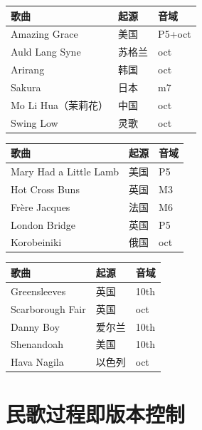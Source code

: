 \documentclass[11pt]{article}
\begin{document}
\begin{card}
\begin{tabularx}{\linewidth}{Xll}
\toprule
\textbf{歌曲} & \textbf{起源} & \textbf{音域} \\
\midrule
Amazing Grace & 美国 & P5+oct \\
Auld Lang Syne & 苏格兰 & oct \\
Arirang & 韩国 & oct \\
Sakura & 日本 & m7 \\
Mo Li Hua（茉莉花） & 中国 & oct \\
Swing Low & 灵歌 & oct \\
\bottomrule
\end{tabularx}
\end{card}

\begin{card}
\begin{tabularx}{\linewidth}{Xll}
\toprule
\textbf{歌曲} & \textbf{起源} & \textbf{音域} \\
\midrule
Mary Had a Little Lamb & 美国 & P5 \\
Hot Cross Buns & 英国 & M3 \\
Fr\`ere Jacques & 法国 & M6 \\
London Bridge & 英国 & P5 \\
Korobeiniki & 俄国 & oct \\
\bottomrule
\end{tabularx}
\end{card}

\begin{card}
\begin{tabularx}{\linewidth}{Xll}
\toprule
\textbf{歌曲} & \textbf{起源} & \textbf{音域} \\
\midrule
Greensleeves & 英国 & 10th \\
Scarborough Fair & 英国 & oct \\
Danny Boy & 爱尔兰 & 10th \\
Shenandoah & 美国 & 10th \\
Hava Nagila & 以色列 & oct \\
\bottomrule
\end{tabularx}
\end{card}

\section{民歌过程即版本控制}
\end{document}
